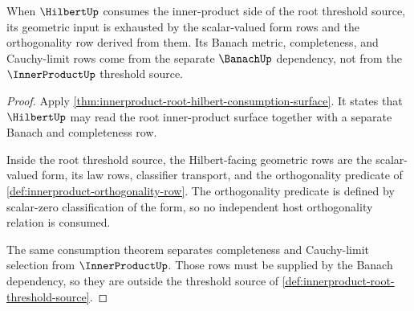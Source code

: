 \begin{theorem}
\label{thm:innerproduct-root-threshold-orthogonality-consumption}
When $\HilbertUp$ consumes the inner-product side of the root threshold
source, its geometric input is exhausted by the scalar-valued form rows and
the orthogonality row derived from them. Its Banach metric, completeness, and
Cauchy-limit rows come from the separate $\BanachUp$ dependency, not from the
$\InnerProductUp$ threshold source.
\end{theorem}
\begin{proof}
Apply \autoref{thm:innerproduct-root-hilbert-consumption-surface}. It states
that $\HilbertUp$ may read the root inner-product surface together with a
separate Banach and completeness row.

Inside the root threshold source, the Hilbert-facing geometric rows are the
scalar-valued form, its law rows, classifier transport, and the
orthogonality predicate of \autoref{def:innerproduct-orthogonality-row}. The
orthogonality predicate is defined by scalar-zero classification of the form,
so no independent host orthogonality relation is consumed.

The same consumption theorem separates completeness and Cauchy-limit
selection from $\InnerProductUp$. Those rows must be supplied by the Banach
dependency, so they are outside the threshold source of
\autoref{def:innerproduct-root-threshold-source}.
\end{proof}

